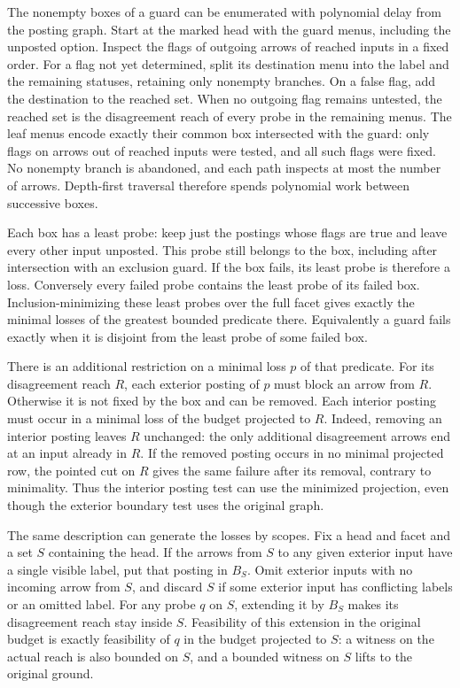 The nonempty boxes of a guard can be enumerated
with polynomial delay from the posting graph.
Start at the marked head with the guard menus,
including the unposted option. Inspect the
flags of outgoing arrows of reached inputs in
a fixed order. For a flag not yet determined,
split its destination menu into the label and
the remaining statuses, retaining only nonempty
branches. On a false flag, add the destination
to the reached set. When no outgoing flag
remains untested, the reached set is the
disagreement reach of every probe in the
remaining menus. The leaf menus encode exactly
their common box intersected with the guard:
only flags on arrows out of reached inputs
were tested, and all such flags were fixed.
No nonempty branch is abandoned, and each
path inspects at most the number of arrows.
Depth-first traversal therefore spends
polynomial work between successive boxes.

Each box has a least probe: keep just the
postings whose flags are true and leave every
other input unposted. This probe still belongs
to the box, including after intersection with
an exclusion guard. If the box fails, its
least probe is therefore a loss. Conversely
every failed probe contains the least probe
of its failed box. Inclusion-minimizing these
least probes over the full facet gives exactly
the minimal losses of the greatest bounded
predicate there. Equivalently a guard fails
exactly when it is disjoint from the least
probe of some failed box.

There is an additional restriction on a minimal
loss $p$ of that predicate. For its disagreement
reach $R$, each exterior posting of $p$ must
block an arrow from $R$. Otherwise it is not
fixed by the box and can be removed. Each
interior posting must occur in a minimal loss
of the budget projected to $R$. Indeed, removing
an interior posting leaves $R$ unchanged: the
only additional disagreement arrows end at
an input already in $R$. If the removed
posting occurs in no minimal projected row,
the pointed cut on $R$ gives the same failure
after its removal, contrary to minimality.
Thus the interior posting test can use the
minimized projection, even though the exterior
boundary test uses the original graph.

The same description can generate the losses by
scopes. Fix a head and facet and a set $S$ containing
the head. If the arrows from $S$ to any given
exterior input have a single visible label, put
that posting in $B_S$. Omit exterior inputs with
no incoming arrow from $S$, and discard $S$ if
some exterior input has conflicting labels or an
omitted label. For any probe $q$ on $S$, extending
it by $B_S$ makes its disagreement reach stay
inside $S$. Feasibility of this extension in
the original budget is exactly feasibility of
$q$ in the budget projected to $S$: a witness
on the actual reach is also bounded on $S$,
and a bounded witness on $S$ lifts to the
original ground.

